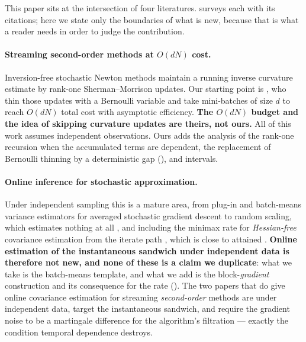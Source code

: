 This paper sits at the intersection of four literatures.  surveys each with its
citations; here we state only the boundaries of what is new, because that is what a reader needs in
order to judge the contribution.

\paragraph{Streaming second-order methods at $O(dN)$ cost.}
Inversion-free stochastic Newton methods maintain a running inverse curvature estimate by rank-one
Sherman--Morrison updates. Our starting point is \citet{godichonbaggioni2025adaptive}, who thin those
updates with a Bernoulli variable and take mini-batches of size $d$ to reach $O(dN)$ total cost with
asymptotic efficiency. \textbf{The $O(dN)$ budget and the idea of skipping curvature updates are
theirs, not ours.} All of this work assumes independent observations. Ours adds the analysis of the
rank-one recursion when the accumulated terms are dependent, the replacement of Bernoulli thinning by
a deterministic gap (), and intervals.

\paragraph{Online inference for stochastic approximation.}
Under independent sampling this is a mature area, from plug-in and batch-means variance estimators for
averaged stochastic gradient descent \citep{chen2020statistical,zhu2023online} to random scaling, which
estimates nothing at all \citep{lee2022fast}, and including the minimax rate for \emph{Hessian-free}
covariance estimation from the iterate path \citep{ni2026online}, which is close to attained
\citep{wei2026refining}. \textbf{Online estimation of the instantaneous sandwich under independent data is
therefore not new, and none of these is a claim we duplicate}: what we take is the batch-means template,
and what we add is the block-\emph{gradient} construction and its consequence for the rate
(). The two papers that do give online covariance estimation for streaming
\emph{second-order} methods \citep{kuang2026online,wang2026inference} are under independent data, target
the instantaneous sandwich, and require the gradient noise to be a martingale difference for the
algorithm's filtration --- exactly the condition temporal dependence destroys.

